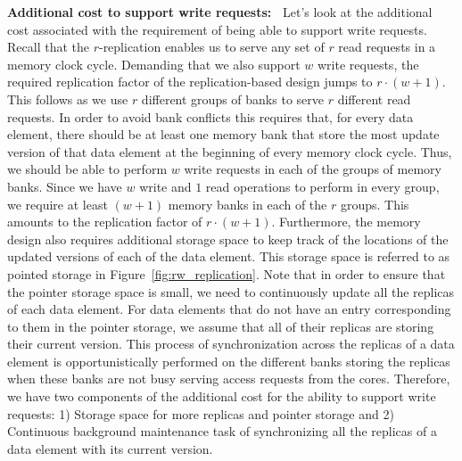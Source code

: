 \noindent \textbf{Additional cost to support write requests:~} Let's look at the additional cost associated with the requirement of being able to support write requests. Recall that the $r$-replication enables us to serve any set of $r$ read requests in a memory clock cycle. Demanding that we also support $w$ write requests, the required replication factor of the replication-based design jumps to $r\cdot(w + 1)$. This follows as we use $r$ different groups of banks to serve $r$ different read requests. In order to avoid bank conflicts this requires that, for every data element, there should be at least one memory bank that store the most update version of that data element at the beginning of every memory clock cycle. Thus, we should be able to perform $w$ write requests in each of the groups of memory banks. Since we have $w$ write and $1$ read operations to perform in every group, we require at least $(w + 1)$ memory banks in each of the $r$ groups. This amounts to the replication factor of $r\cdot(w +1)$. Furthermore, the memory design also requires additional storage space to keep track of the locations of the updated versions of each of the data element. This storage space is referred to as pointed storage in Figure~\ref{fig:rw_replication}. Note that in order to ensure that the pointer storage space is small, we need to continuously update all the replicas of each data element. For data elements that do not have an entry corresponding to them in the pointer storage, we assume that all of their replicas are storing their current version. This process of synchronization across the replicas of a data element is opportunistically performed on the different banks storing the replicas when these banks are not busy serving access requests from the cores. Therefore, we have two components of the additional cost for the ability to support write requests: 1) Storage space for more replicas and pointer storage and  2) Continuous background maintenance task of synchronizing all the replicas of a data element with its current version. 

